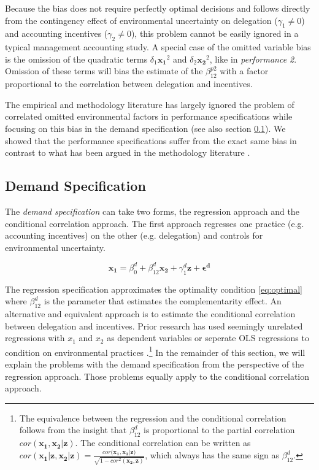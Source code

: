 \documentclass[12pt]{article}
\begin{document}
Because the bias does not require perfectly optimal decisions and follows directly from the contingency effect of environmental uncertainty on delegation ($\gamma_1 \neq 0$) and accounting incentives ($\gamma_2 \neq 0$), this problem cannot be easily ignored in a typical management accounting study. A special case of the omitted variable bias is the omission of the quadratic terms $\delta_1 \mathbf{x_1}^2$ and $\delta_2 \mathbf{x_2}^2$, like in \emph{performance 2}. Omission of these terms will bias the estimate of the $\beta^{p2}_{12}$ with a factor proportional to the correlation between delegation and incentives.

The empirical and methodology literature has largely ignored the problem of correlated omitted environmental factors in performance specifications while focusing on this bias in the demand specification (see also section \ref{demand-specification}). We showed that the performance specifications suffer from the exact same bias in contrast to what has been argued in the methodology literature \citep{carree_note_2011}. 

\subsection{Demand Specification}\label{demand-specification}

The \emph{demand specification} can take two forms, the regression approach and the conditional correlation approach. The first approach regresses one practice (e.g. accounting incentives) on the other (e.g. delegation) and controls for environmental uncertainty.

\begin{equation*} 
\mathbf{x_1} = \beta_0^d + \beta_{12}^d \mathbf{x_2} 
        + \gamma_{1}^d \mathbf{z}
        + \mathbf{\epsilon^d}
\end{equation*}

The regression specification approximates the optimality condition \eqref{eq:optimal} where \(\beta^d_{12}\) is the parameter that estimates the complementarity effect. An alternative and equivalent approach is to estimate the conditional correlation between delegation and incentives. Prior research has used seemingly unrelated regressions with $x_1$ and $x_2$ as dependent variables or seperate OLS regressions to condition on environmental practices \citep{indjejikian_accounting_2012, matejka_balancing_2017}.\footnote{The equivalence between the regression and the conditional correlation follows from the insight that $\beta^d_{12}$ is proportional to the partial correlation $cor(\mathbf{x_1}, \mathbf{x_2|z})$. The conditional correlation can be written as $cor(\mathbf{x_1|z}, \mathbf{x_2|z}) = \frac{cor(\mathbf{x_1}, \mathbf{x_2|z)}}{\sqrt{1 - cor^2(\mathbf{x_2}, \mathbf{z})}}$, which always has the same sign as $\beta_{12}^d.$} In the remainder of this section, we will explain the problems with the demand specification from the perspective of the regression approach. Those problems equally apply to the conditional correlation approach.  
\end{document}

